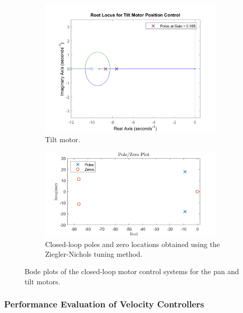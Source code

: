 \documentclass[../../main.tex]{subfiles}
\begin{document}
\begin{figure}[h]
\begin{subfigure}{0.48\textwidth}
    \includegraphics[width = 0.97\textwidth]{Sections/System_Design/Images/RL_TiltMotorVelPolePlace.png}
    \caption{Tilt motor.}
    \label{fig:vel_root_locus}
\end{subfigure}\quad
\begin{subfigure}{0.48\textwidth}
    \includegraphics[width = 0.97\textwidth]{Sections/System_Design/Images/PoleZero_TiltMotorVel_NZ.png}
    \caption{Closed-loop poles and zero locations obtained using the Ziegler-Nichols tuning method.}
    \label{fig:ZN_pole_zero}
\end{subfigure}
\caption{Bode plots of the closed-loop motor control systems for the pan and tilt motors.}
\label{fig:vel_poles_zeros}
\end{figure}

\subsubsection*{Performance Evaluation of Velocity Controllers}
\end{document}
